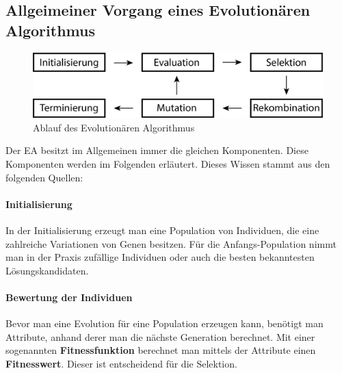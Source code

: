 \subsection{Allgeimeiner Vorgang eines Evolution{\"a}ren Algorithmus}
\begin{figure}
	\centering
    \includegraphics[width=\textwidth]{pics/algoSchritte.png}
    \caption{Ablauf des Evolution{\"a}ren Algorithmus}
    \label{fig:algoSchritte}
\end{figure}
Der EA besitzt im Allgemeinen immer die gleichen Komponenten. Diese Komponenten werden im Folgenden erl{\"a}utert. Dieses Wissen stammt aus den folgenden Quellen: \cite{shiffman2012nature, flickevolutionare, weicker2015evolutionare}

\paragraph*{Initialisierung}
In der Initialisierung erzeugt man eine Population von Individuen, die eine zahlreiche Variationen von Genen besitzen. F{\"u}r die Anfangs-Population nimmt man in der Praxis zuf{\"a}llige Individuen oder auch die besten bekanntesten L{\"o}sungskandidaten.

\paragraph*{Bewertung der Individuen}
Bevor man eine Evolution f{\"u}r eine Population erzeugen kann, ben{\"o}tigt man Attribute, anhand derer man die n{\"a}chste Generation berechnet. 
Mit einer sogenannten \textbf{Fitnessfunktion} berechnet man mittels der Attribute einen \textbf{Fitnesswert}. Dieser ist entscheidend f{\"u}r die Selektion.



